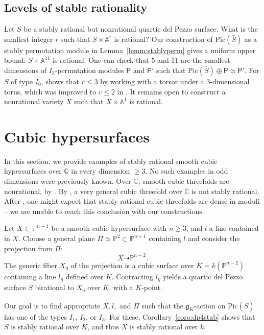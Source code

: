 \documentclass[12pt, reqno]{amsart}
\theoremstyle{plain}
\theoremstyle{remark}
\theoremstyle{definition}
\numberwithin{equation}{section}
\def\bA{{\mathbb A}}
\def\bP{{\mathbb P}}
\def\bQ{{\mathbb Q}}
\def\bC{{\mathbb C}}
\def\Pic{\mathrm{Pic}}
\begin{document}
 \subsection*{Levels of stable rationality}
Let $S$ be a stably rational but nonrational quartic del Pezzo surface. What is the smallest integer $r$ such that $S\times\bA^r$ is rational?  
    Our construction of $\Pic(\bar{S})$ as a stably permutation module in Lemma~\ref{lemm:stablyperm} gives a uniform upper bound: $S\times\bA^{11}$ is rational. One can check that 5 and 11 are the smallest dimensions of $I_3$-permutation modules $\mathsf P$ and $\mathsf P'$ such that $\Pic(\bar{S})\oplus\mathsf P\simeq \mathsf P'$.   
    For $S$ of type $I_0$, \cite{bctspstably} shows that $r\leq 3$ by working with a torsor under a 3-dimensional torus, which was improved to $r\leq 2$ in \cite{SBstab}. It remains open to construct a nonrational variety $X$ such that $X\times\bA^1$ is rational.


\section{Cubic hypersurfaces}
\label{sect:cub}

In this section, we provide examples of stably rational smooth cubic hypersurfaces over $\bQ$ in every dimension $\ge 3$. No such examples in odd dimensions were previously known. Over $\bC$,  smooth cubic threefolds  are  nonrational, by \cite{CG}.  By \cite{cubicmatroid}, a very general cubic threefold over $\bC$ is not stably rational. After \cite{Voisincubic}, one might expect that stably rational cubic threefolds are dense in moduli -- we are unable to reach this conclusion with our constructions.  


Let $X\subset\bP^{n+1}$ be a smooth cubic hypersurface with $n\geq3$, and $l$ a line contained in $X$. Choose a general plane $\Pi\simeq\bP^{2}\subset\bP^{n+1}$ containing $l$ and consider the projection from $\Pi$:
$$
X\dashrightarrow\bP^{n-2}.
$$
The generic fiber $X_{\eta}$ of the projection is a cubic surface over $K=k(\bP^{n-2})$ containing a line $l_\eta$ defined over $K$. Contracting $l_\eta$ yields  a quartic del Pezzo surface 
$S$ birational to $X_\eta$ over $K$, with a $K$-point. 

Our goal is to find appropriate $X,l,$ and $\Pi$ such that the $\mathfrak g_K$-action on $\Pic(\bar S)$ has one of the types $I_1$, $I_2$, or $I_3$. For these, Corollary~\ref{coro:dp4stab} shows that $S$ is stably rational over $K$, and thus $X$ is stably rational over $k$. 
\end{document}
